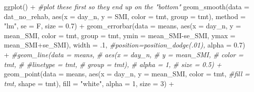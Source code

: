 \documentclass[
]{article}
\newenvironment{Shaded}{\begin{snugshade}}{\end{snugshade}}
\newcommand{\AttributeTok}[1]{\textcolor[rgb]{0.77,0.63,0.00}{#1}}
\newcommand{\CommentTok}[1]{\textcolor[rgb]{0.56,0.35,0.01}{\textit{#1}}}
\newcommand{\DecValTok}[1]{\textcolor[rgb]{0.00,0.00,0.81}{#1}}
\newcommand{\FloatTok}[1]{\textcolor[rgb]{0.00,0.00,0.81}{#1}}
\newcommand{\FunctionTok}[1]{\textcolor[rgb]{0.00,0.00,0.00}{#1}}
\newcommand{\NormalTok}[1]{#1}
\newcommand{\SpecialCharTok}[1]{\textcolor[rgb]{0.00,0.00,0.00}{#1}}
\newcommand{\StringTok}[1]{\textcolor[rgb]{0.31,0.60,0.02}{#1}}
\begin{document}
\begin{Shaded}
\begin{Highlighting}[]
\FunctionTok{ggplot}\NormalTok{() }\SpecialCharTok{+} 
  \CommentTok{\#plot these first so they end up on the "bottom"}
  \FunctionTok{geom\_smooth}\NormalTok{(}\AttributeTok{data =}\NormalTok{ dat\_no\_rehab,}
                  \FunctionTok{aes}\NormalTok{(}\AttributeTok{x =}\NormalTok{ day\_n,}
                \AttributeTok{y =}\NormalTok{ SMI, }
                \AttributeTok{color =}\NormalTok{ tmt,}
                \AttributeTok{group =}\NormalTok{ tmt),}
              \AttributeTok{method =} \StringTok{"lm"}\NormalTok{,}
              \AttributeTok{se =}\NormalTok{ F,}
              \AttributeTok{size =} \FloatTok{0.7}\NormalTok{) }\SpecialCharTok{+}
  \FunctionTok{geom\_errorbar}\NormalTok{(}\AttributeTok{data =}\NormalTok{ means,}
                  \FunctionTok{aes}\NormalTok{(}\AttributeTok{x =}\NormalTok{ day\_n,}
                \AttributeTok{y =}\NormalTok{ mean\_SMI, }
                \AttributeTok{color =}\NormalTok{ tmt,}
                \AttributeTok{group =}\NormalTok{ tmt,}
                \AttributeTok{ymin =}\NormalTok{ mean\_SMI}\SpecialCharTok{{-}}\NormalTok{se\_SMI, }
                \AttributeTok{ymax =}\NormalTok{ mean\_SMI}\SpecialCharTok{+}\NormalTok{se\_SMI),}
                \AttributeTok{width =}\NormalTok{ .}\DecValTok{1}\NormalTok{,}
                \CommentTok{\#position=position\_dodge(.01),}
                \AttributeTok{alpha =} \FloatTok{0.7}\NormalTok{) }\SpecialCharTok{+}
  \CommentTok{\#geom\_line(data = means,}
   \CommentTok{\#         aes(x = day\_n,}
    \CommentTok{\#            y = mean\_SMI, }
     \CommentTok{\#           color = tmt,}
      \CommentTok{\#          \#linetype = tmt,}
       \CommentTok{\#         group = tmt),}
        \CommentTok{\#    alpha = 1, }
         \CommentTok{\#   size = 0.5) +}
  \FunctionTok{geom\_point}\NormalTok{(}\AttributeTok{data =}\NormalTok{ means,}
            \FunctionTok{aes}\NormalTok{(}\AttributeTok{x =}\NormalTok{ day\_n,}
                \AttributeTok{y =}\NormalTok{ mean\_SMI, }
                \AttributeTok{color =}\NormalTok{ tmt,}
                \CommentTok{\#fill = tmt,}
                \AttributeTok{shape =}\NormalTok{ tmt),}
            \AttributeTok{fill =} \StringTok{"white"}\NormalTok{,}
            \AttributeTok{alpha =} \DecValTok{1}\NormalTok{, }
            \AttributeTok{size =} \DecValTok{3}\NormalTok{) }\SpecialCharTok{+}
  

\end{Highlighting}
\end{Shaded}
\end{document}
